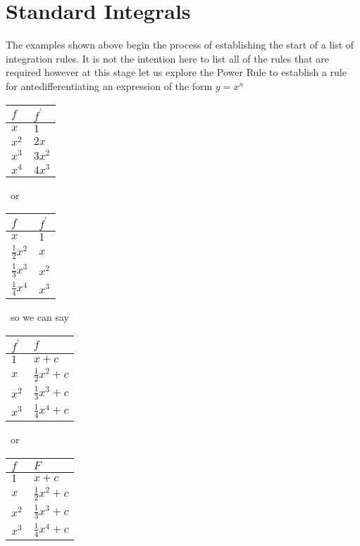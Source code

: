 \section{Standard Integrals}
The examples shown above begin the process of establishing the start of a list of integration rules. It
is not the intention here to list all of the rules that are required however at this stage let us explore the Power Rule to establish a rule for antedifferentiating
an expression of the form $y =x^{n}$ 

\bigskip 
\begin{center}
\begin{tabular}[c]{ll}\hline
$f$  & $f^{ \prime }$  \\
\hline
$x$  & $1$  \\
\hline
$x^{2}$  & $2 x$  \\
\hline
$x^{3}$  & $3 x^{2}$  \\
\hline
$x^{4}$  & $4 x^{3}$  \\
\hline
\end{tabular}\ or
\
\begin{tabular}[c]{ll}\hline
$f$  & $f^{ \prime }$  \\
\hline
$x$  & $1$  \\
\hline
$\frac{1}{2} x^{2}$  & $x$  \\
\hline
$\frac{1}{3} x^{3}$  & $x^{2}$  \\
\hline
$\frac{1}{4} x^{4}$  & $x^{3}$  \\
\hline
\end{tabular}\ so
we can say \
\begin{tabular}[c]{ll}\hline
$f^{ \prime }$  & $f$  \\
\hline
$1$  & $x +c$  \\
\hline
$x$  & $\frac{1}{2} x^{2} +c$  \\
\hline
$x^{2}$  & $\frac{1}{3} x^{3} +c$  \\
\hline
$x^{3}$  & $\frac{1}{4} x^{4} +c$  \\
\hline
\end{tabular}\ or
\
\begin{tabular}[c]{ll}\hline
$f$  & $F$  \\
\hline
$1$  & $x +c$  \\
\hline
$x$  & $\frac{1}{2} x^{2} +c$  \\
\hline
$x^{2}$  & $\frac{1}{3} x^{3} +c$  \\
\hline
$x^{3}$  & $\frac{1}{4} x^{4} +c$  \\
\hline
\end{tabular}\end{center}

